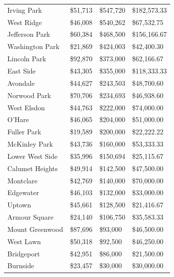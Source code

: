 \documentclass{article}
\begin{document}
\begin{table}[h!]
\begin{tabular}{|l|l|l|l|}
Irving Park            & \$51,713       & \$547,720         & \$182,573.33    \\
West Ridge             & \$46,008       & \$540,262         & \$67,532.75     \\
Jefferson Park         & \$60,384       & \$468,500         & \$156,166.67    \\
Washington Park        & \$21,869       & \$424,003         & \$42,400.30     \\
Lincoln Park           & \$92,870       & \$373,000         & \$62,166.67     \\
East Side              & \$43,305       & \$355,000         & \$118,333.33    \\
Avondale               & \$44,627       & \$243,503         & \$48,700.60     \\
Norwood Park           & \$70,706       & \$234,693         & \$46,938.60     \\
West Elsdon            & \$44,763       & \$222,000         & \$74,000.00     \\
O'Hare                 & \$46,065       & \$204,000         & \$51,000.00     \\
Fuller Park            & \$19,589       & \$200,000         & \$22,222.22     \\
McKinley Park          & \$43,736       & \$160,000         & \$53,333.33     \\
Lower West Side        & \$35,996       & \$150,694         & \$25,115.67     \\
Calumet Heights        & \$49,914       & \$142,500         & \$47,500.00     \\
Montclare              & \$42,769       & \$140,000         & \$70,000.00     \\
Edgewater              & \$46,103       & \$132,000         & \$33,000.00     \\
Uptown                 & \$45,661       & \$128,500         & \$21,416.67     \\
Armour Square          & \$24,140       & \$106,750         & \$35,583.33     \\
Mount Greenwood        & \$87,696       & \$93,000          & \$46,500.00     \\
West Lawn              & \$50,318       & \$92,500          & \$46,250.00     \\
Bridgeport             & \$42,951       & \$86,000          & \$21,500.00     \\
Burnside               & \$23,457       & \$30,000          & \$30,000.00     \\

\end{tabular}
\end{table}
\end{document}
